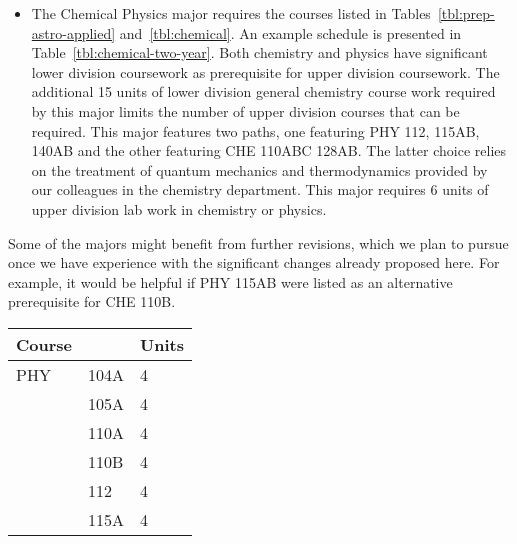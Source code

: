 \documentclass[12pt]{article}
\begin{document}
\begin{itemize}
\item The Chemical Physics major requires the courses listed in
  Tables~\ref{tbl:prep-astro-applied} and~\ref{tbl:chemical}.  An
  example schedule is presented in Table~\ref{tbl:chemical-two-year}.
  Both chemistry and physics have significant lower division
  coursework as prerequisite for upper division coursework.  The
  additional 15 units of lower division general chemistry course
  work required by this major limits the number of upper division
  courses that can be required.  This major features two paths, one
  featuring PHY 112, 115AB, 140AB and the other featuring CHE 110ABC
  128AB.  The latter choice relies on the treatment of quantum
  mechanics and thermodynamics provided by our colleagues in the
  chemistry department.  This major requires 6 units of upper division
  lab work in chemistry or physics.
\end{itemize}
Some of the majors might benefit from further revisions, which we plan
to pursue once we have experience with the significant changes already
proposed here.  For example, it would be helpful if PHY 115AB were
listed as an alternative prerequisite for CHE 110B.

\noindent
\vskip 0.25cm
\begin{center}
\begin{tabular}{|lll|}
\hline
Course & & Units \\
\hline
PHY & 104A   & 4 \\  
    & 105A   & 4 \\ 
    & 110A   & 4 \\ 
    & 110B   & 4 \\
    & 112    & 4 \\
    & 115A   & 4 \\ 
\hline
\end{tabular}
\end{center}
\end{document}
